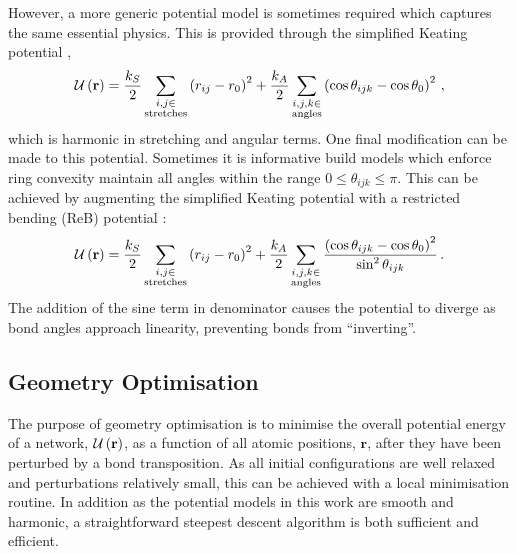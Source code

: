 However, a more generic potential model is sometimes required which captures the same essential physics.
This is provided through the simplified Keating potential \cite{VonAlfthan2003},
\begin{equation}
	\mathcal{U}\left(\mathbf{r}\right) = \frac{k_S}{2}\sum_{\substack{i,j\in \\ \text{stretches}}}\left(r_{ij}-r_0\right)^2 + \frac{k_A}{2}\sum_{\substack{i,j,k \in \\ \text{angles}}} \left(\cos\theta_{ijk}-\cos\theta_0\right)^2\,,
\end{equation}
which is harmonic in stretching and angular terms.
One final modification can be made to this potential. 
Sometimes it is informative build models which enforce ring convexity \ie{} maintain all angles within the range $0\leq \theta_{ijk} \leq \pi$.
This can be achieved by augmenting the simplified Keating potential with a restricted bending (ReB) potential \cite{Bulacu2013}:
\begin{equation}
	\mathcal{U}\left(\mathbf{r}\right) = \frac{k_S}{2}\sum_{\substack{i,j\in \\ \text{stretches}}}\left(r_{ij}-r_0\right)^2 + \frac{k_A}{2}\sum_{\substack{i,j,k \in \\ \text{angles}}} \frac{\left(\cos\theta_{ijk}-\cos\theta_0\right)^2}{\sin^{2}\theta_{ijk}}\,.
\end{equation}
The addition of the sine term in denominator causes the potential to diverge as bond angles approach linearity, preventing bonds from ``inverting''.

\subsection{Geometry Optimisation}
\label{s:geomopt}

The purpose of geometry optimisation is to minimise the overall potential energy of a network, $\mathcal{U}\left(\mathbf{r}\right)$, as a function of all atomic positions, $\mathbf{r}$, after they have been perturbed \eg{} by a bond transposition.
As all initial configurations are well relaxed and perturbations relatively small, this can be achieved with a local minimisation routine.
In addition as the potential models in this work are smooth and harmonic, a straightforward steepest descent algorithm is both sufficient and efficient.

